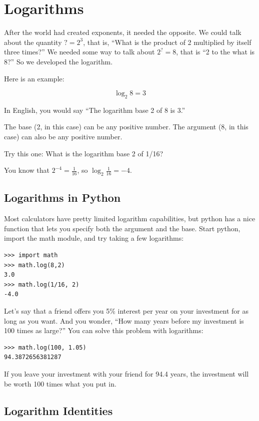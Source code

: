 \chapter{Logarithms}

After the world had created exponents, it needed the opposite. We
could talk about the quantity $? = 2^3$, that is, ``What is the
product of 2 multiplied by itself three times?''  We needed some way
to talk about $2^? = 8$, that is ``2 to the what is 8?'' So we
developed the logarithm. 

Here is an example:

$$\log_{2}8 = 3$$

In English, you would say ``The logarithm base 2 of 8 is 3.''

The base (2, in this case) can be any positive number. The argument
(8, in this case) can also be any positive number.

Try this one: What is the logarithm base 2 of 1/16?

You know that $2^{-4} = \frac{1}{16}$, so $\log_{2} \frac{1}{16} = -4$.

\section{Logarithms in Python}

Most calculators have pretty limited logarithm capabilities, but
python has a nice  function that lets you specify both
the argument and the base.  Start python, import the math module, and try taking a few logarithms:

\begin{Verbatim}
>>> import math
>>> math.log(8,2)
3.0
>>> math.log(1/16, 2)
-4.0
\end{Verbatim}

Let's say that a friend offers you 5\% interest per year on your
investment for as long as you want. And you wonder, ``How many years
before my investment is 100 times as large?'' You can solve this problem with logarithms:

\begin{Verbatim}
>>> math.log(100, 1.05)
94.3872656381287
\end{Verbatim}

If you leave your investment with your friend for 94.4 years, the
investment will be worth 100 times what you put in.

\section{Logarithm Identities}

